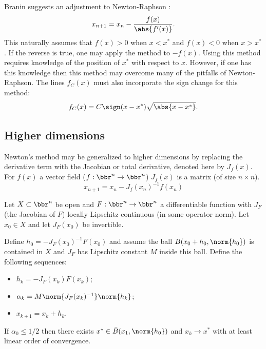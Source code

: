 \documentclass{article}
\begin{document}
Branin suggests an adjustment to Newton-Raphson \cite{branin1972widely}:
\begin{equation*}
x_{n+1} = x_n - \frac{f(x)}{\abs{f'(x)}} .
\end{equation*}
This naturally assumes that $f(x) > 0$ when $x < x^*$ and $f(x) < 0$ when $x > x^*$.
If the reverse is true, one may apply the method to $-f(x)$.
Using this method requires knowledge of the position of $x^*$ with respect to $x$.
However, if one has this knowledge then this method may overcome many of the pitfalls of Newton-Raphson.
The lines $f_C(x)$ must also incorporate the sign change for this method:
\begin{equation*}
f_C(x) = C \sign(x - x^*) \sqrt{\abs{x-x^*}} .
\end{equation*}

\subsection{Higher dimensions}


Newton's method may be generalized to higher dimensions by replacing the derivative term with the Jacobian or total derivative, denoted here by $J_f(x)$.
For $f(x)$ a vector field ($f:\bbr^n \to \bbr^n$) $J_f(x)$ is a matrix (of size $n \times n$).
\begin{equation} \label{eq:NRgen}
	x_{n+1} = x_n - J_f(x_n)^{-1} f(x_n)
\end{equation}

\begin{thm}[Kantorovich]
Let $X \subset \bbr^n$ be open and $F:\bbr^n \to \bbr^n$ a differentiable function with $J_F$ (the Jacobian of $F$) locally Lipschitz continuous (in some operator norm).
Let $x_0 \in X$ and let $J_F(x_0)$ be invertible.

Define $h_0 = -J_F(x_0)^{-1} F(x_0)$ and assume the ball $B(x_0 + h_0, \norm{h_0})$ is contained in $X$ and $J_F$ has Lipschitz constant $M$ inside this ball.
Define the following sequences: \begin{itemize}
\item $h_k = -J_F(x_k) F(x_k)$;
\item $\alpha_k = M \norm{J_F(x_k)^{-1}} \norm{h_k}$;
\item $x_{k+1} = x_k + h_k$.
\end{itemize}

If $\alpha_0 \leq 1/2$ then there exists $x^* \in \bar{B}(x_1, \norm{h_0})$ and $x_k \to x^*$ with at least linear order of convergence.
\end{thm}
\end{document}
